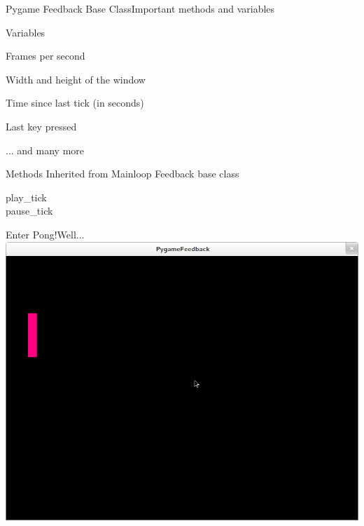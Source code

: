 \documentclass{beamer}
\begin{document}
\begin{frame}{Pygame Feedback Base Class}{Important methods and variables}

    \begin{block}{Variables}
        \begin{description}[xxxxxxxxxxxxxx]
            \item[FPS] Frames per second
            \item[screenSize] Width and height of the window
            \item[elapsed] Time since last tick (in seconds)
            \item[lastkey\_unicode] Last key pressed
        \end{description}
        ... and many more
    \end{block}

    \begin{block}{Methods}
        Inherited from Mainloop Feedback base class
        \begin{description}
            \item[play\_tick]
            \item[pause\_tick]
        \end{description}
    \end{block}
\end{frame}


\begin{frame}{Enter Pong!}{Well...}
    \includegraphics[width=0.9\linewidth]{pong}
\end{frame}
\end{document}
